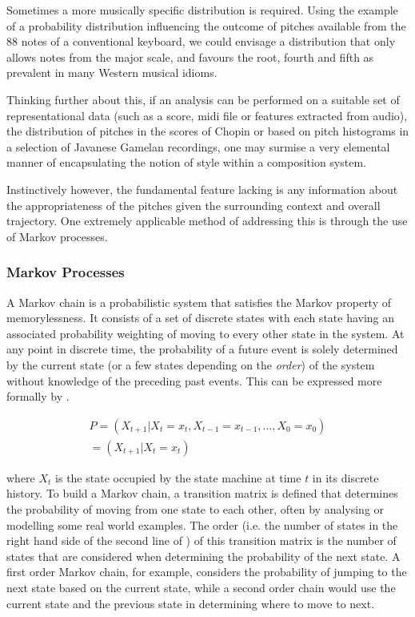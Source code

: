 Sometimes a more musically specific distribution is required. Using the example of a probability distribution influencing the outcome of pitches available from the 88 notes of a conventional keyboard, we could envisage a distribution that only allows notes from the major scale, and favours the root, fourth and fifth as prevalent in many Western musical idioms.

Thinking further about this, if an analysis can be performed on a suitable set of representational data (such as a score, \acrshort{midi} file or features extracted from audio), the distribution of pitches in the scores of Chopin or based on pitch histograms in a selection of Javanese Gamelan recordings, one may surmise a very elemental manner of encapsulating the notion of style within a composition system. 

Instinctively however, the fundamental feature lacking is any information about the appropriateness of the pitches given the surrounding context and overall trajectory. One extremely applicable method of addressing this is through the use of Markov processes.

\subsubsection{Markov Processes}
\label{sec:markov_chains}

A Markov chain is a probabilistic system that satisfies the Markov property of memorylessness. It consists of a set of discrete states with each state having an associated probability weighting of moving to every other state in the system. At any point in discrete time, the probability of a future event is solely determined by the current state (or a few states depending on the \textit{order}) of the system without knowledge of the preceding past events. This can be expressed more formally by .

\begin{equation}
  \label{eq:markov}
  \begin{gathered}
P=(X_{t+1}|X_{t}=x_{t},X_{t-1}=x_{t-1},...,X_{0}=x_{0}) \\
=(X_{t+1}|X_{t}=x_{t})
  \end{gathered}
\end{equation}

where $X_t$ is the state occupied by the state machine at time $t$ in its discrete history. To build a Markov chain, a transition matrix is defined that determines the probability of moving from one state to each other, often by analysing or modelling some real world examples. The order (i.e. the number of states in the right hand side of the second line of ) of this transition matrix is the number of states that are considered when determining the probability of the next state. A first order Markov chain, for example, considers the probability of jumping to the next state based on the current state, while a second order chain would use the current state and the previous state in determining where to move to next.

